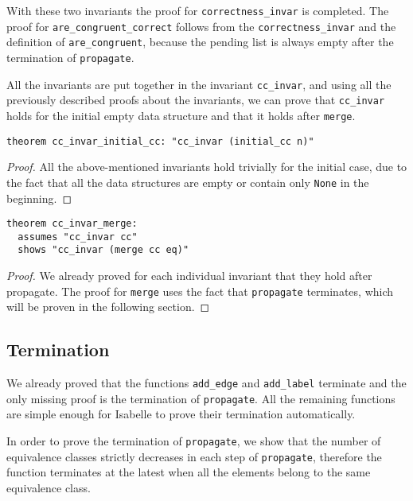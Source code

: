 With these two invariants the proof for \lstinline{correctness_invar} is completed.
The proof for \lstinline{are_congruent_correct} follows from the \lstinline{correctness_invar} and the definition of \lstinline|are_congruent|, because
the pending list is always empty after the termination of \lstinline|propagate|.

All the invariants are put together in the invariant \lstinline{cc_invar}, and using all the previously described proofs about the invariants, we can prove that \lstinline{cc_invar} holds for the initial empty data structure and that it holds after \lstinline{merge}.

\begin{lstlisting}
theorem cc_invar_initial_cc: "cc_invar (initial_cc n)"
\end{lstlisting}

\begin{proof}
All the above-mentioned invariants hold trivially for the initial case, due to the fact that all the data structures are empty or contain only \lstinline{None} in the beginning.
\end{proof}

\begin{lstlisting}
theorem cc_invar_merge:
  assumes "cc_invar cc"
  shows "cc_invar (merge cc eq)"
\end{lstlisting}

\begin{proof}
We already proved for each individual invariant that they hold after propagate.
The proof for \lstinline|merge| uses the fact that \lstinline{propagate} terminates, which will be proven in the following section.
\end{proof}

\subsection{Termination}\label{section:termination-propagate}

We already proved that the functions \lstinline|add_edge| and \lstinline|add_label| terminate and the only missing proof is the termination of \lstinline|propagate|. All the remaining functions are simple enough for Isabelle to prove their termination automatically.

In order to prove the termination of \lstinline{propagate}, we show that the number of equivalence classes strictly decreases in each step of \lstinline{propagate}, therefore the function terminates at the latest when all the elements belong to the same equivalence class.

